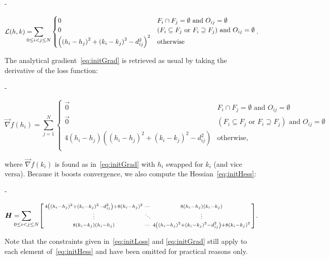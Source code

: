 \documentclass[
  oneside,
  openany,
  numbers=noendperiod,
  parskip=half,
  bibliography=totoc
]{scrbook}\usepackage[]{graphicx}\usepackage{xcolor}
\newlength{\overhang}
\newenvironment{fullwidth}{
  \begin{addmargin*}[0em]{-\overhang}
}{
  \end{addmargin*}
}
\newcommand{\svdots}{\raisebox{3pt}{$\scalebox{.75}{\vdots}$}}
\newcommand{\sddots}{\raisebox{3pt}{$\scalebox{.75}{$\ddots$}$}}
\begin{document}
\begin{fullwidth}
\begin{equation}
  \mathcal{L}(h,k) = \displaystyle\smashoperator[l]{\sum_{0\leq i<j\leq N}}
  \begin{cases}
    0 & F_i \cap F_j = \emptyset \text{ and } O_{ij} = \emptyset\\
    0 & (F_i \subseteq F_j \text{ or } F_i \supseteq F_j) \text{ and } O_{ij}=\emptyset\\
   \left(\left(h_i-h_j\right)^2+\left(k_i-k_j\right)^2-d_{ij}^2\right)^2  & \text{otherwise} \\
  \end{cases}. \label{eq:initLoss}
\end{equation}
\end{fullwidth}
The analytical gradient~\eqref{eq:initGrad} is retrieved as usual by
taking the derivative of the loss function:
\begin{fullwidth}
\begin{equation}
  \vec{\nabla} f(h_i) = \sum_{j=1}^N
  \begin{cases}
    \vec{0} & F_i \cap F_j = \emptyset \text{ and } O_{ij} = \emptyset\\
    \vec{0} & (F_i \subseteq F_j \text{ or } F_i \supseteq F_j) \text{ and } O_{ij}=\emptyset\\
    4\left(h_i-h_j\right)\left(\left(h_i-h_j\right)^2+\left(k_i-k_j\right)^2-d_{ij}^2\right) & \text{otherwise}, \\
  \end{cases} \label{eq:initGrad}
\end{equation}
\end{fullwidth}
where $\vec{\nabla} f(k_i)$ is found as in~\eqref{eq:initGrad} with $h_i$
swapped for $k_i$ (and vice versa). Because it boosts convergence, we also
compute the Hessian~\eqref{eq:initHess}:
\begin{fullwidth}
\begin{equation}
  \bm{H} = \smashoperator[l]{\sum_{0\leq i<j\leq N}}
  \begin{bsmallmatrix}
    4\left(\left(h_i-h_j\right)^2+\left(k_i-k_j\right)^2-d_{ij}^2\right)+8\left(h_i-h_j\right)^2 &
    \cdots &
    8\left(h_i-h_j\right)\left(k_i-k_j\right)\\
    \svdots & \sddots & \svdots \\
    8\left(k_i-k_j\right)\left(h_i-h_j\right) &
    \cdots &
    4\left(\left(h_i-h_j\right)^2+\left(k_i-k_j\right)^2-d_{ij}^2\right)+8\left(k_i-k_j\right)^2
  \end{bsmallmatrix}.
\label{eq:initHess}
\end{equation}
\end{fullwidth}
Note that the constraints given in~\eqref{eq:initLoss} and \eqref{eq:initGrad}
still apply to each element of~\eqref{eq:initHess} and have been omitted for
practical reasons only.
\end{document}
